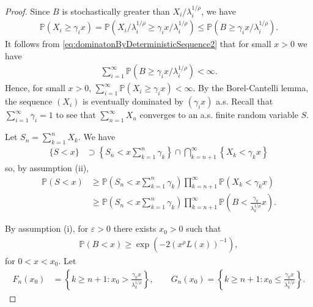 \documentclass[bj]{imsart}
\numberwithin{equation}{section}
\renewcommand{\P}{\mathbb{P}}
\newcommand{\1}{\mathbf{1}}
\theoremstyle{definition}
\begin{document}
\begin{proof}
Since $B$ is stochastically greater than $X_i/\lambda_i^{1/\rho}$, we have 
\begin{align*}
\P(X_i\geq \gamma_ix)=
\P(X_i/\lambda_i^{1/\rho}\geq \gamma_ix/\lambda_i^{1/\rho})\leq \P(B\geq \gamma_ix/\lambda_i^{1/\rho}).
\end{align*}
It follows from \eqref{eq:dominatonByDeterministicSequence2}
 that for  small $x>0$ we have 
\begin{align}\label{j13.1}
\sum_{i=1}^{\infty} \P\left(B\geq  \gamma_ix/\lambda_i^{1/\rho}\right)<\infty.
\end{align}
Hence, for small $x>0$,  $\sum_{i=1}^{\infty} \P\left(X_i\geq \gamma_ix\right)<\infty$. By the Borel-Cantelli lemma,
 the sequence $(X_i)$ is eventually dominated by 
$\left(\gamma_ix\right)$ a.s. Recall that $\sum_{i=1}^\infty\gamma_i=1$ to see that $\sum_{n=1}^{\infty}X_n$
converges to an a.s. finite random variable $S$.

Let $S_n=\sum_{k=1}^nX_k$. We have
\begin{align*}
 \{S<x\}&\supset \left\{S_n<x\sum_{k=1}^n\gamma_k\right\}
 \cap \bigcap_{k=n+1}^{\infty} \left\{X_{k}<\gamma_{k}x\right\}
\end{align*}
so, by assumption (ii),
\begin{align}
 \P(S<x)&\geq \P\left(S_n<x\sum_{k=1}^n\gamma_k\right) \prod_{k=n+1}^{\infty} \P\left(X_{k}<\gamma_{k}x\right)\nonumber\\
&\geq \P\left(S_n<x\sum_{k=1}^n\gamma_k\right) \prod_{k=n+1}^{\infty} \P\left(B<\frac{\gamma_{k}}{\lambda_{k}^{1/\rho}}x\right). \label{eq:probabilityProduct1}
\end{align} 

By assumption (i), for $\varepsilon>0$
there exists $x_0>0$ such that 
\begin{align*}
\P(B<x)\geq \exp(-2(x^\rho L(x))^{-1}),
\end{align*}
for $0< x < x_0$.
Let 
\begin{align*}
F_n(x_0)&=\left\{k\geq n+1:x_0>\frac{\gamma_kx}{\lambda_k^{1/\rho}}\right\},
\qquad
G_n(x_0)=\left\{k\geq n+1:x_0\leq\frac{\gamma_kx}{\lambda_k^{1/\rho}}\right\}.
\end{align*}


\end{proof}
\end{document}
